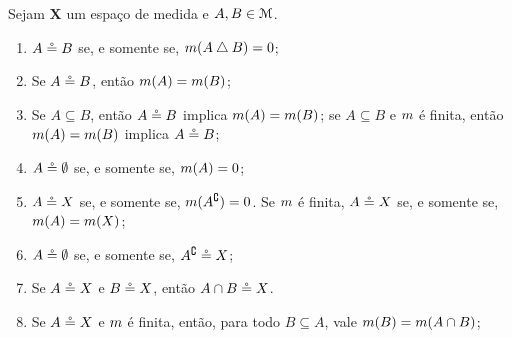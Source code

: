 \begin{proposition}
Sejam $\bm X$ um espaço de medida e $A,B \in \mathcal{M}$.
	\begin{enumerate}
	\item $A \circeq B$ se, e somente se, $m(A \mathbin{\triangle} B) = 0$;
	\item Se $A \circeq B$, então $m(A)=m(B)$;
	\item Se $A \subseteq B$, então $A \circeq B$ implica $m(A)=m(B)$; se $A \subseteq B$ e $m$ é finita, então $m(A)=m(B)$ implica $A \circeq B$;
	\item $A \circeq \emptyset$ se, e somente se, $m(A)=0$;
	\item $A \circeq X$ se, e somente se, $m(A^\complement)=0$. Se $m$ é finita, $A \circeq X$ se, e somente se, $m(A)=m(X)$;
	\item $A \circeq \emptyset$ se, e somente se, $A^\complement \circeq X$;
	\item Se $A \circeq X$ e $B \circeq X$, então $A \cap B \circeq X$.
	\item Se $A \circeq X$ e $m$ é finita, então, para todo $B \subseteq A$, vale $	m(B) = m(A \cap B)$;
	\end{enumerate}
\end{proposition}
